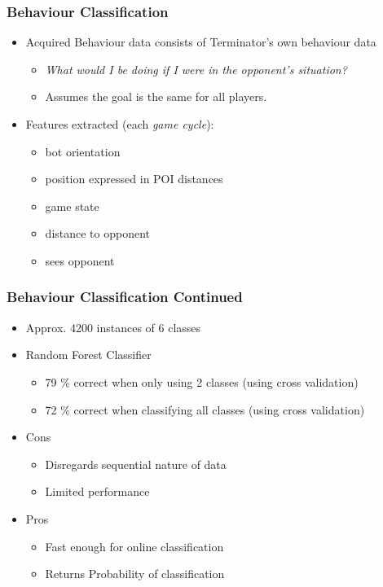 \documentclass{beamer}
\begin{document}
\begin{frame}
    \frametitle{Behaviour Classification}
    \begin{itemize}
        \item Acquired Behaviour data consists of Terminator's own behaviour  data
            \begin{itemize}
                \item \emph{What would I be doing if I were in the opponent's
                    situation?}
            \item Assumes the goal is the same for all players.
            \end{itemize}
        \item Features extracted (each \emph{game cycle}):
            \begin{itemize}
                \item bot orientation
                \item position expressed in POI distances
                \item game state
                \item distance to opponent
                \item sees opponent
            \end{itemize}
    \end{itemize}
    \end{frame}

\begin{frame}
    \frametitle{Behaviour Classification Continued}
    \begin{itemize}
        \item Approx. 4200 instances of 6 classes 
        \item  Random Forest Classifier
            \begin{itemize}
            \item 79 \% correct when only using 2 classes (using
                cross validation)
            \item 72 \% correct when classifying all classes (using
                cross validation)
        \end{itemize}
        \item Cons
        \begin{itemize}
        \item Disregards sequential nature of data
        \item Limited performance
        \end{itemize}
        \item Pros
        \begin{itemize}
            \item Fast enough for online classification
            \item Returns Probability of classification
        \end{itemize}
    \end{itemize}
\end{frame}
\end{document}
